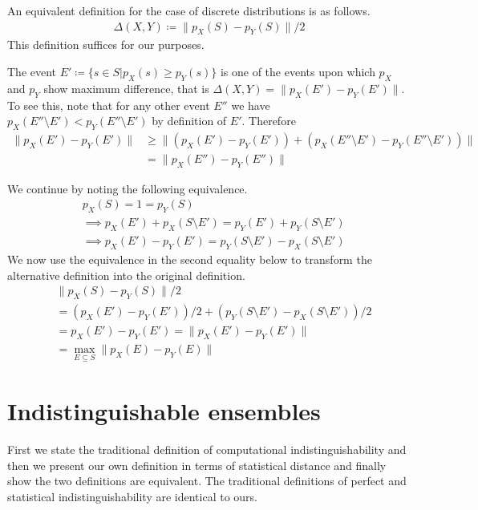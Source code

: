 \begin{theorem}
    An equivalent definition for the case of discrete distributions is as follows.
    \begin{align}
         \Delta(X,Y) \coloneqq \|p_X(S) - p_Y(S)\|/2
    \end{align}
    This definition suffices for our purposes.

    \proof
    The event $E'\coloneq\{s\in S | p_X(s)\geq p_Y(s)\}$ is one of the events upon which $p_X$ and $p_Y$ show maximum difference, that is $\Delta(X,Y) = \|p_X(E') - p_Y(E')\|$.
    To see this, note that for any other event $E''$ we have $p_X(E''\setminus E') < p_Y(E''\setminus E')$ by definition of $E'$.
    Therefore
    \begin{align}
        \|p_X(E') - p_Y(E')\|
        &\geq \|(p_X(E') - p_Y(E')) + (p_X(E''\setminus E') - p_Y(E''\setminus E'))\| \\
        &= \|p_X(E'') - p_Y(E'')\|
    \end{align}

    We continue by noting the following equivalence.
    \begin{align}
        &p_X(S) = 1 = p_Y(S) \\
        &\implies p_X(E') + p_X(S\setminus E') = p_Y(E') + p_Y(S\setminus E') \\
        &\implies p_X(E') - p_Y(E') = p_Y(S\setminus E') - p_X(S\setminus E')
    \end{align}
    We now use the equivalence in the second equality below to transform the alternative definition into the original definition.
    \begin{align}
        &\|p_X(S) - p_Y(S)\|/2 \\
        &= (p_X(E') - p_Y(E'))/2 + (p_Y(S\setminus E') - p_X(S\setminus E'))/2 \\
        &= p_X(E') - p_Y(E') = \|p_X(E') - p_Y(E')\| \\
        &= \max_{E\subseteq S} \|p_X(E) - p_Y(E)\|
    \end{align}
\end{theorem}


\section{Indistinguishable ensembles}

First we state the traditional definition of computational indistinguishability and then we present our own definition in terms of statistical distance and finally show the two definitions are equivalent.
The traditional definitions of perfect and statistical indistinguishability are identical to ours.

